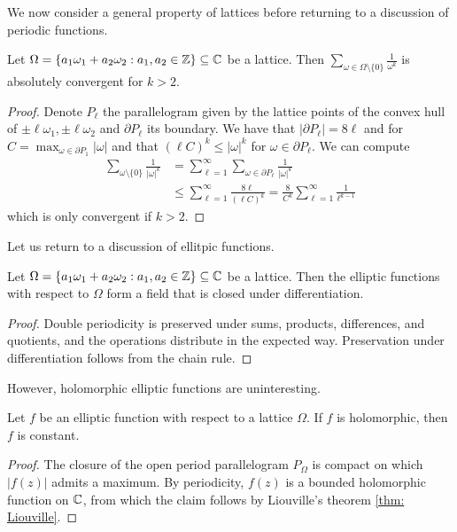 We now consider a general property of lattices before returning to a discussion of periodic functions. 
\begin{proposition}\label{prop: absolute convergence of lattice sum}
    Let $\Omega=\{a_{1}\omega_{1}+a_{2}\omega_{2}:a_{1},a_{2}\in\mathbb{Z}\}\subseteq\mathbb{C}$ be a lattice. Then $\sum_{\omega\in\Omega\setminus\{0\}}\frac{1}{\omega^{k}}$ is absolutely convergent for $k>2$. 
\end{proposition}
\begin{proof}
    Denote $P_{\ell}$ the parallelogram given by the lattice points of the convex hull of $\pm\ell\omega_{1},\pm\ell\omega_{2}$ and $\partial P_{\ell}$ its boundary. We have that $|\partial P_{\ell}|=8\ell$ and for $C=\max_{\omega\in\partial P_{1}}|\omega|$ and that $(\ell C)^{k}\leq |\omega|^{k}$ for $\omega\in\partial P_{\ell}$. We can compute 
    \begin{align*}
        \sum_{\omega\setminus\{0\}}\frac{1}{|\omega|^{k}} &=\sum_{\ell=1}^{\infty}\sum_{\omega\in\partial P_{\ell}}\frac{1}{|\omega|^{k}} \\ 
        &\leq \sum_{\ell=1}^{\infty}\frac{8\ell}{(\ell C)^{k}} = \frac{8}{C^{k}}\sum_{\ell=1}^{\infty}\frac{1}{\ell^{k-1}}
    \end{align*}
    which is only convergent if $k>2$. 
\end{proof}
Let us return to a discussion of ellitpic functions. 
\begin{proposition}\label{prop: elliptic functions form a field}
    Let $\Omega=\{a_{1}\omega_{1}+a_{2}\omega_{2}:a_{1},a_{2}\in\mathbb{Z}\}\subseteq\mathbb{C}$ be a lattice. Then the elliptic functions with respect to $\Omega$ form a field that is closed under differentiation. 
\end{proposition}
\begin{proof}
    Double periodicity is preserved under sums, products, differences, and quotients, and the operations distribute in the expected way. Preservation under differentiation follows from the chain rule. 
\end{proof}
However, holomorphic elliptic functions are uninteresting. 
\begin{proposition}\label{prop: holomorhic elliptic are constant}
    Let $f$ be an elliptic function with respect to a lattice $\Omega$. If $f$ is holomorphic, then $f$ is constant. 
\end{proposition}
\begin{proof}
    The closure of the open period parallelogram $P_{\Omega}$ is compact on which $|f(z)|$ admits a maximum. By periodicity, $f(z)$ is a bounded holomorphic function on $\mathbb{C}$, from which the claim follows by Liouville's theorem \ref{thm: Liouville}. 
\end{proof}
